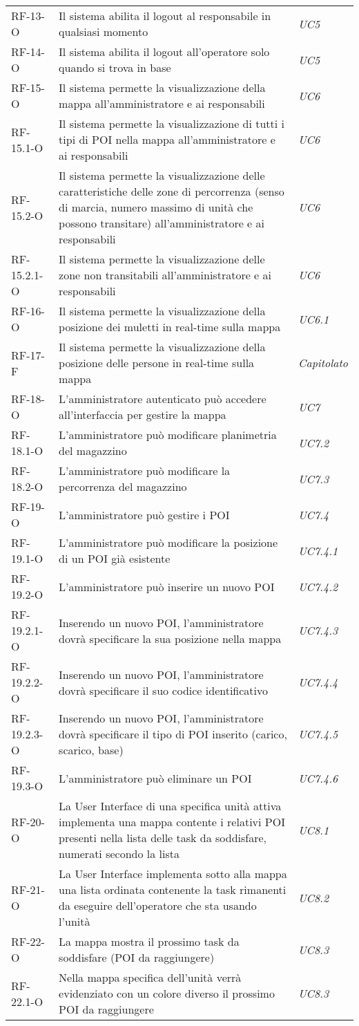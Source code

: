 \begin{longtable}{ 
		>{\centering}p{} 
		>{}p{}
		>{\centering \it}p{} }
RF-13-O & Il sistema abilita il logout al responsabile in qualsiasi momento & UC5\tabularnewline
RF-14-O & Il sistema abilita il logout all'operatore solo quando si trova in base & UC5\tabularnewline
RF-15-O & Il sistema permette la visualizzazione della mappa all’amministratore e ai responsabili & UC6\tabularnewline
RF-15.1-O & Il sistema permette la visualizzazione di tutti i tipi di POI nella mappa all’amministratore e ai responsabili & UC6\tabularnewline
RF-15.2-O & Il sistema permette la visualizzazione delle caratteristiche delle zone di percorrenza (senso di marcia, numero massimo di unità che possono transitare) all’amministratore e ai responsabili & UC6\tabularnewline
RF-15.2.1-O & Il sistema permette la visualizzazione delle zone non transitabili all’amministratore e ai responsabili & UC6\tabularnewline
RF-16-O & Il sistema permette la visualizzazione della posizione dei muletti in real-time sulla mappa & UC6.1\tabularnewline
RF-17-F & Il sistema permette la visualizzazione della posizione delle persone in real-time sulla mappa & Capitolato\tabularnewline
RF-18-O & L’amministratore autenticato può accedere all’interfaccia per gestire la mappa  & UC7\tabularnewline
RF-18.1-O & L’amministratore può modificare planimetria del magazzino & UC7.2\tabularnewline
RF-18.2-O & L’amministratore può modificare la percorrenza del magazzino & UC7.3\tabularnewline
RF-19-O & L’amministratore può gestire i POI & UC7.4\tabularnewline
RF-19.1-O & L'amministratore può modificare la posizione di un POI già esistente & UC7.4.1\tabularnewline
RF-19.2-O & L'amministratore può inserire un nuovo POI & UC7.4.2\tabularnewline
RF-19.2.1-O & Inserendo un nuovo POI, l'amministratore dovrà specificare la sua posizione nella mappa & UC7.4.3\tabularnewline
RF-19.2.2-O & Inserendo un nuovo POI, l'amministratore dovrà specificare il suo codice identificativo & UC7.4.4\tabularnewline
RF-19.2.3-O & Inserendo un nuovo POI, l'amministratore dovrà specificare il tipo di POI inserito (carico, scarico, base) & UC7.4.5\tabularnewline
RF-19.3-O & L'amministratore può eliminare un POI & UC7.4.6\tabularnewline
RF-20-O & La User Interface di una specifica unità attiva implementa una mappa contente i relativi POI presenti nella lista delle task da soddisfare, numerati secondo la lista & UC8.1\tabularnewline
RF-21-O & La User Interface implementa sotto alla mappa una lista ordinata contenente la task rimanenti da eseguire dell’operatore che sta usando l’unità & UC8.2\tabularnewline
RF-22-O & La mappa mostra il prossimo task da soddisfare (POI da raggiungere) & UC8.3\tabularnewline
RF-22.1-O & Nella mappa specifica dell’unità verrà evidenziato con un colore diverso il prossimo POI da raggiungere & UC8.3\tabularnewline

\end{longtable}
